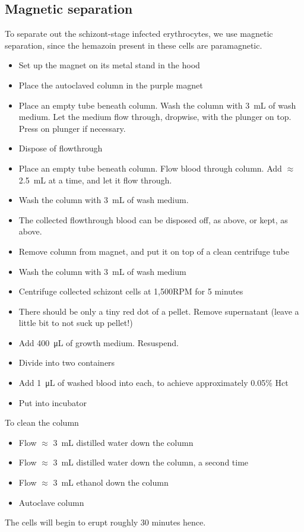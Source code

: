 \documentclass{article}
\begin{document}
\subsection{Magnetic separation}

To separate out the schizont-stage infected erythrocytes, we use magnetic separation, since the hemazoin present in these cells are paramagnetic.\\

\begin{itemize}
	\item Set up the magnet on its metal stand in the hood
	\item Place the autoclaved column in the purple magnet
	\item Place an empty tube beneath column. Wash the column with \SI{3}{mL} of wash medium. Let the medium flow through, dropwise, with the plunger on top. Press on plunger if necessary.
	\item Dispose of flowthrough
	\item Place an empty tube beneath column. Flow blood through column. Add $\approx$ \SI{2.5}{mL} at a time, and let it flow through.
	\item Wash the column with \SI{3}{mL} of wash medium.
	\item The collected flowthrough blood can be disposed off, as above, or kept, as above.
	\item Remove column from magnet, and put it on top of a clean centrifuge tube
	\item Wash the column with \SI{3}{mL} of wash medium
	\item Centrifuge collected schizont cells at 1,500RPM for 5 minutes
	\item There should be only a tiny red dot of a pellet. Remove supernatant (leave a little bit to not suck up pellet!)
	\item Add \SI{400}{\micro\liter} of growth medium. Resuspend.
	\item Divide into two containers
	\item Add \SI{1}{\micro\liter} of washed blood into each, to achieve approximately 0.05\% Hct
	\item Put into incubator
\end{itemize}

To clean the column

\begin{itemize}
	\item Flow $\approx$ \SI{3}{mL} distilled water down the column
	\item Flow $\approx$ \SI{3}{mL} distilled water down the column, a second time
	\item Flow $\approx$ \SI{3}{mL} ethanol down the column
	\item Autoclave column
\end{itemize}

The cells will begin to erupt roughly 30 minutes hence.
\end{document}
